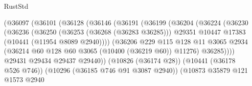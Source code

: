 \begin{lexlean}{RustStd}
\begin{coremodule}
                                    (@36097
                                      (@36101
                                        (@36128
                                          (@36146
                                            (@36191
                                              (@36199
                                                (@36204
                                                  (@36224
                                                    (@36230
                                                      (@36236
                                                        (@36250
                                                          (@36253 (@36268 (@36283 @36285)))
                                                          @29351
                                                          @10447
                                                          @17383
                                                          (@10441 (@11954 @8089 @2940))))
                                                      (@36206
                                                        @229
                                                        @115
                                                        @128
                                                        @11
                                                        @3065
                                                        @2934
                                                        (@36214
                                                          @60
                                                          @128
                                                          @60
                                                          @3065
                                                          (@10400 (@36219 @60))
                                                          @11276)
                                                        @36285))))
                                                @29431
                                                @29434
                                                @29437
                                                @29440))
                                            (@10826 (@36174 @28))
                                            (@10441 (@36178 @526 @746))
                                            (@10296 (@36185 @746 @91 @3087 @2940))
                                            (@10873
                                              @35879
                                              @121
                                              @1573
                                              @2940

\end{coremodule}
\end{lexlean}
